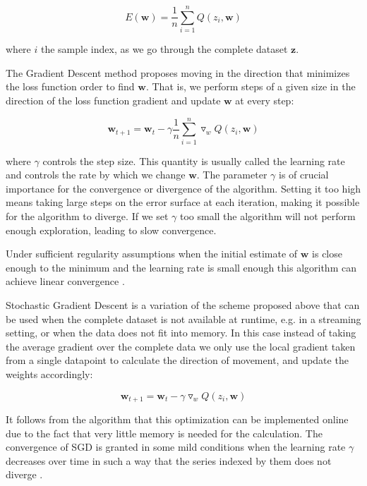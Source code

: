 \documentclass[11pt,a4paper]{article}
\newcommand{\Wb}{\mathbf{w}}
\begin{document}
\begin{equation}
E(\Wb) = \frac{1}{n} \sum_{i=1}^n Q(z_i, \Wb)
\end{equation}

where $i$ the sample index, as we go through the complete dataset $\mathbf{z}$.

The Gradient Descent method proposes moving in the direction that minimizes the loss function order to
find $\Wb$. That is, we perform steps of a given size in the direction of the loss function gradient
and update $\Wb$ at every step:

\begin{equation}
\Wb_{t + 1} = \Wb_t - \gamma \frac{1}{n} \sum_{i=1}^n \triangledown_w Q(z_i, \Wb)
\end{equation}

where $\gamma$ controls the step size. This quantity is usually called the learning rate and
controls the rate by which we change $\Wb$. The parameter $\gamma$ is of crucial importance for the
convergence or divergence of the algorithm. Setting it too high means taking large steps 
on the error surface at each iteration,
making it possible for the algorithm to diverge. If we set $\gamma$ too small the algorithm
will not perform enough exploration, leading to slow convergence.

Under sufficient regularity assumptions when the initial estimate of $\Wb$ is close enough to the
minimum and the learning rate is small enough this algorithm can achieve linear convergence
\cite{dennis1996numerical}.

Stochastic Gradient Descent is a variation of the scheme proposed above that can be used
when the complete dataset is not available at runtime, e.g. in a streaming setting,
or when the data does not fit into memory.
In this case instead of taking the average gradient over the complete data we only use the local
gradient taken from a single datapoint to calculate the direction of movement, and update the
weights accordingly:

\begin{equation}
\Wb_{t + 1} = \Wb_t - \gamma  \triangledown_w Q(z_i, \Wb)
\end{equation}

It follows from the algorithm that this optimization can be implemented online due to the fact that
very little memory is needed for the calculation. The convergence of SGD is granted
in  some mild conditions when the learning rate $\gamma$ decreases over time in such a way that the
series  indexed by them does not diverge \cite{bottou2010large}.
\end{document}
